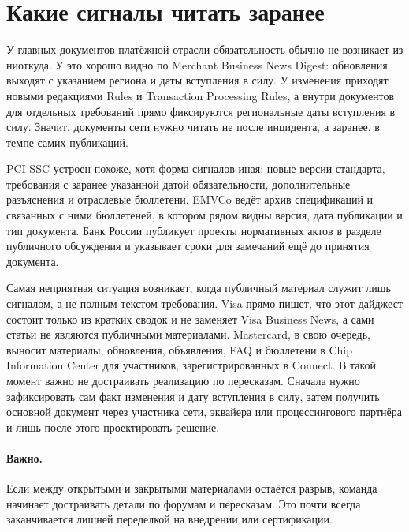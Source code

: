 \section{Какие сигналы читать заранее}
\label{sec:ps-tracking-bulletins}

У главных документов платёжной отрасли обязательность обычно
не возникает из ниоткуда. У  это хорошо видно
по Merchant Business News Digest: обновления выходят с указанием
региона и даты вступления в силу. У  изменения
приходят новыми редакциями Rules и Transaction Processing Rules,
а внутри документов для отдельных требований прямо фиксируются
региональные даты вступления в силу.\cite{visa-business-news-digest,mc-rules,mc-tpr}
Значит, документы сети нужно читать не после инцидента, а заранее,
в темпе самих публикаций.

PCI SSC устроен похоже, хотя форма сигналов иная: новые версии
стандарта, требования с заранее указанной датой обязательности,
дополнительные разъяснения и отраслевые бюллетени.\cite{pci-dss-4,pci-faq-1585,pci-format4-suspension}
EMVCo ведёт архив спецификаций и связанных с ними бюллетеней,
в котором рядом видны версия, дата публикации и тип документа.\cite{emvco-bulletins-archive}
Банк России публикует проекты нормативных актов в разделе
публичного обсуждения и указывает сроки для замечаний ещё
до принятия документа.\cite{cbr-project-na}

Самая неприятная ситуация возникает, когда публичный материал
служит лишь сигналом, а не полным текстом требования. Visa прямо
пишет, что этот дайджест состоит только из кратких сводок
и не заменяет Visa Business News, а сами статьи не являются
публичными материалами. Mastercard, в свою очередь, выносит
материалы, обновления, объявления, FAQ и бюллетени в Chip
Information Center для участников, зарегистрированных
в Connect.\cite{visa-business-news-digest,mc-chip-info-center}
В такой момент важно не достраивать реализацию по пересказам.
Сначала нужно зафиксировать сам факт изменения и дату вступления
в силу, затем получить основной документ через участника сети,
эквайера или процессингового партнёра и лишь после этого
проектировать решение.
\paragraph{Важно.}
Если между открытыми и закрытыми материалами остаётся разрыв, команда начинает достраивать детали по форумам и пересказам. Это почти всегда заканчивается лишней переделкой на внедрении или сертификации.



